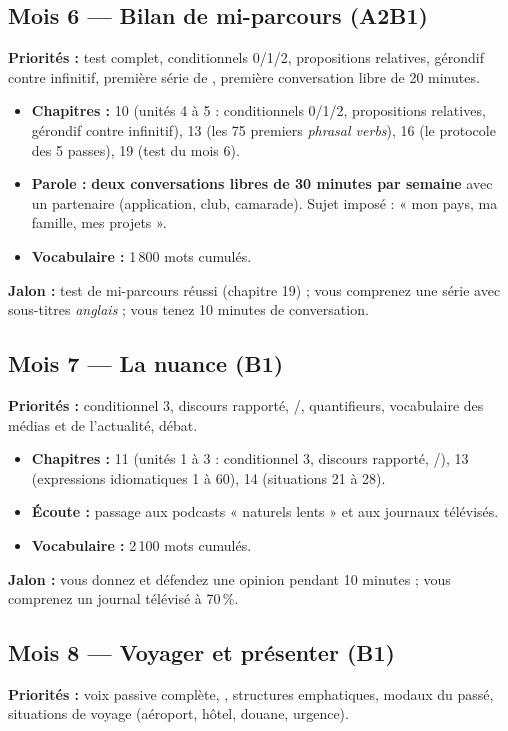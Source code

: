 \subsection{Mois 6 --- Bilan de mi-parcours (A2\ra B1)}
\textbf{Priorités :} test complet, conditionnels 0/1/2, propositions relatives,
gérondif contre infinitif, première série de , première conversation
libre de 20 minutes.

\begin{itemize}
  \item \textbf{Chapitres :} 10 (unités 4 à 5 : conditionnels 0/1/2, propositions relatives,
  gérondif contre infinitif), 13 (les 75 premiers \emph{phrasal verbs}),
  16 (le protocole des 5 passes), 19 (test du mois 6).
  \item \textbf{Parole :} \textbf{deux conversations libres de 30 minutes par semaine} avec un
  partenaire (application, club, camarade). Sujet imposé : « mon pays, ma famille, mes projets ».
  \item \textbf{Vocabulaire :} 1\,800 mots cumulés.
\end{itemize}
\textbf{Jalon :} test de mi-parcours réussi (chapitre 19) ; vous comprenez une série
avec sous-titres \emph{anglais} ; vous tenez 10 minutes de conversation.

\subsection{Mois 7 --- La nuance (B1)}
\textbf{Priorités :} conditionnel 3, discours rapporté, /,
quantifieurs, vocabulaire des médias et de l'actualité, débat.

\begin{itemize}
  \item \textbf{Chapitres :} 11 (unités 1 à 3 : conditionnel 3, discours rapporté,
  /), 13 (expressions idiomatiques 1 à 60), 14 (situations 21 à 28).
  \item \textbf{Écoute :} passage aux podcasts « naturels lents » et aux journaux télévisés.
  \item \textbf{Vocabulaire :} 2\,100 mots cumulés.
\end{itemize}
\textbf{Jalon :} vous donnez et défendez une opinion pendant 10 minutes ; vous comprenez
un journal télévisé à 70\,\%.

\subsection{Mois 8 --- Voyager et présenter (B1)}
\textbf{Priorités :} voix passive complète, , structures emphatiques,
modaux du passé, situations de voyage (aéroport, hôtel, douane, urgence).

